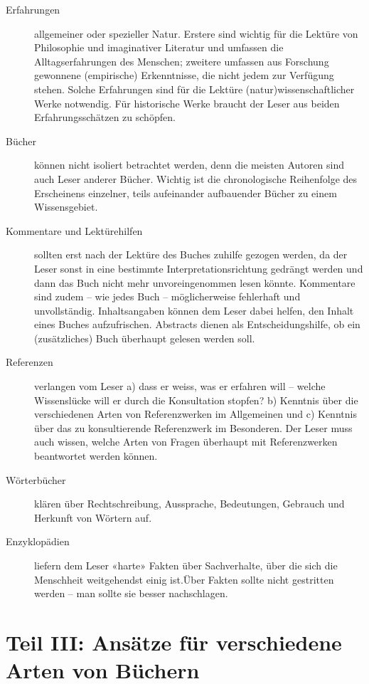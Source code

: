 \documentclass[a4paper,11pt]{scrartcl}
\begin{document}
\begin{description}
\item[Erfahrungen] allgemeiner oder spezieller Natur. Erstere sind wichtig für die Lektüre von Philosophie und imaginativer Literatur und umfassen die Alltagserfahrungen des Menschen; zweitere umfassen aus Forschung gewonnene (empirische) Erkenntnisse, die nicht jedem zur Verfügung stehen. Solche Erfahrungen sind für die Lektüre (natur)wissenschaftlicher Werke notwendig. Für historische Werke braucht der Leser aus beiden Erfahrungsschätzen zu schöpfen.
\item[Bücher] können nicht isoliert betrachtet werden, denn die meisten Autoren sind auch Leser anderer Bücher. Wichtig ist die chronologische Reihenfolge des Erscheinens einzelner, teils aufeinander aufbauender Bücher zu einem Wissensgebiet.
\item[Kommentare und Lektürehilfen] sollten erst nach der Lektüre des Buches zuhilfe gezogen werden, da der Leser sonst in eine bestimmte Interpretationsrichtung gedrängt werden und dann das Buch nicht mehr unvoreingenommen lesen könnte. Kommentare sind zudem – wie jedes Buch – möglicherweise fehlerhaft und unvollständig. Inhaltsangaben können dem Leser dabei helfen, den Inhalt eines Buches aufzufrischen. Abstracts dienen als Entscheidungshilfe, ob ein (zusätzliches) Buch überhaupt gelesen werden soll.
\item[Referenzen] verlangen vom Leser a) dass er weiss, was er erfahren will – welche Wissenslücke will er durch die Konsultation stopfen? b) Kenntnis über die verschiedenen Arten von Referenzwerken im Allgemeinen und c) Kenntnis über das zu konsultierende Referenzwerk im Besonderen. Der Leser muss auch wissen, welche Arten von Fragen überhaupt mit Referenzwerken beantwortet werden können.
\item[Wörterbücher] klären über Rechtschreibung, Aussprache, Bedeutungen, Gebrauch und Herkunft von Wörtern auf.
\item[Enzyklopädien] liefern dem Leser «harte» Fakten über Sachverhalte, über die sich die Menschheit weitgehendst einig ist.Über Fakten sollte nicht gestritten werden – man sollte sie besser nachschlagen.
\end{description}

\newpage
\section*{Teil III: Ansätze für verschiedene Arten von Büchern}
\end{document}
